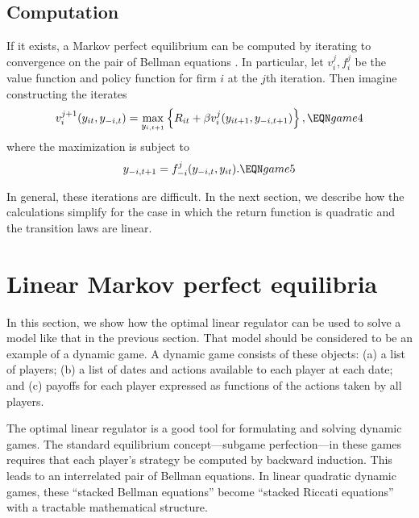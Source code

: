 \subsection{Computation}

  If it exists, a Markov perfect equilibrium can be computed
by iterating to convergence on the pair of Bellman equations
.  In particular, let $v_i^j,f_i^j$ be the value function
and policy function for firm $i$ at the $j$th iteration.  Then
imagine constructing the iterates
$$ v_i^{j+1}(y_{it}, y_{-i,t}) = \max_{y_{i,t+1}} \left\{
    R_{it} + \beta v_i^{j}(y_{it+1}, y_{-i,t+1}) \right\}, \EQN game4 $$
where the maximization is subject to
$$ y_{-i,t+1} = f^j_{-i}(y_{-i,t}, y_{it}). \EQN game5 $$

  In general, these iterations are difficult.
In the next section, we describe how
the calculations simplify for the case in which
the return function is quadratic and the transition laws are linear.
\section{Linear Markov perfect equilibria}
In this section, we show how the optimal linear regulator
can be used to solve a model like that in the previous section.
That model should be considered to be
 an example of a dynamic game.  A dynamic  game consists
of these objects: (a) a list of players; (b) a list of dates and
actions available to each player at each date; and (c) payoffs
for each player expressed as  functions of the actions taken
by all players.

  The optimal linear regulator is a good tool for formulating  and solving
dynamic games.  The standard equilibrium
concept---subgame perfection---in these games requires
that each player's strategy be computed
by backward induction.   This leads to an interrelated pair
of Bellman equations. In linear quadratic dynamic games, these
``stacked Bellman equations'' become ``stacked Riccati equations''
with a tractable mathematical structure.

